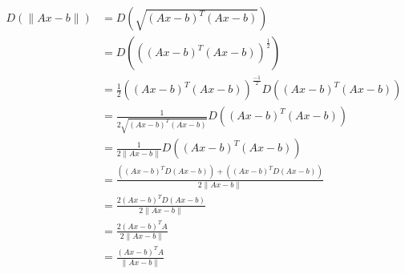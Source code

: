 \documentclass{article}
\begin{document}
    \begin{align*}
        D\left( \| Ax-b \| \right) &= D \left( \sqrt{(Ax-b)^T (Ax-b)} \right) \\
        &= D \left( \left( (Ax-b)^T (Ax-b) \right)^{\frac{1}{2}} \right) \\
        &= \frac{1}{2} \left((Ax-b)^T (Ax-b) \right)^{\frac{-1}{2}} D \left( (Ax-b)^T (Ax-b) \right) \\
        &= \frac{1}{2 \sqrt { (Ax-b)^T (Ax-b) }} D \left( (Ax-b)^T (Ax-b) \right) \\
        &= \frac{1}{2 \| Ax-b \| } D \left( (Ax-b)^T (Ax-b) \right) \\
        &= \frac{ \left( (Ax-b)^T D(Ax-b) \right) + \left( (Ax-b)^T D(Ax-b) \right) }{2 \| Ax-b \| } \\
        &= \frac{ 2(Ax-b)^T D(Ax-b) }{2 \| Ax-b \| } \\
        &= \frac{ 2(Ax-b)^T A }{2 \| Ax-b \| } \\
        &= \frac{ (Ax-b)^T A }{\| Ax-b \| }
    \end{align*}
\end{document}
